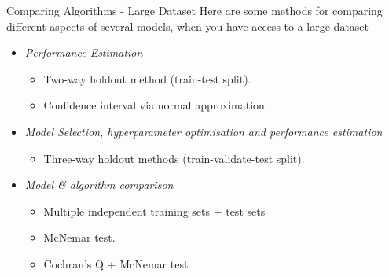 \documentclass[11pt,a4paper]{article}
\begin{document}
  \begin{proposition}{Comparing Algorithms - Large Dataset}
    Here are some methods for comparing different aspects of several models, when you have access to a large dataset
    \begin{itemize}
      \item \textit{Performance Estimation}
      \begin{itemize}
        \item Two-way holdout method (train-test split).
        \item Confidence interval via normal approximation.
      \end{itemize}
      \item \textit{Model Selection, hyperparameter optimisation and performance estimation}
      \begin{itemize}
        \item Three-way holdout methods (train-validate-test split).
      \end{itemize}
      \item \textit{Model \& algorithm comparison}
      \begin{itemize}
        \item Multiple independent training sets + test sets
        \item McNemar test.
        \item Cochran's Q + McNemar test
      \end{itemize}
    \end{itemize}
  \end{proposition}
\end{document}

